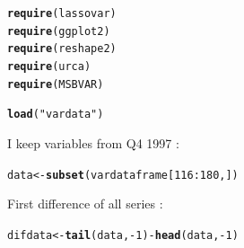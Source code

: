 \documentclass[11pt,oneside, a4paper]{amsart}\usepackage[]{graphicx}\usepackage[]{color}
\makeatletter
\newcommand{\hlnum}[1]{\textcolor[rgb]{0.686,0.059,0.569}{#1}}%
\newcommand{\hlstr}[1]{\textcolor[rgb]{0.192,0.494,0.8}{#1}}%
\newcommand{\hlopt}[1]{\textcolor[rgb]{0,0,0}{#1}}%
\newcommand{\hlstd}[1]{\textcolor[rgb]{0.345,0.345,0.345}{#1}}%
\newcommand{\hlkwb}[1]{\textcolor[rgb]{0.69,0.353,0.396}{#1}}%
\newcommand{\hlkwd}[1]{\textcolor[rgb]{0.737,0.353,0.396}{\textbf{#1}}}%
\newenvironment{kframe}{%
 \def\at@end@of@kframe{}%
 \ifinner\ifhmode%
  \def\at@end@of@kframe{\end{minipage}}%
  \begin{minipage}{\columnwidth}%
 \fi\fi%
 \def\FrameCommand##1{\hskip\@totalleftmargin \hskip-\fboxsep
 \colorbox{shadecolor}{##1}\hskip-\fboxsep
     \hskip-\linewidth \hskip-\@totalleftmargin \hskip\columnwidth}%
 \MakeFramed {\advance\hsize-\width
   \@totalleftmargin\z@ \linewidth\hsize
   \@setminipage}}%
 {\par\unskip\endMakeFramed%
 \at@end@of@kframe}
\newenvironment{knitrout}{}{} %
\makeatother
\begin{document}
\begin{knitrout}
\color{fgcolor}\begin{kframe}
\begin{alltt}
\hlkwd{require}\hlstd{(lassovar)}
\hlkwd{require}\hlstd{(ggplot2)}
\hlkwd{require}\hlstd{(reshape2)}
\hlkwd{require}\hlstd{(urca)}
\hlkwd{require}\hlstd{(MSBVAR)}
\end{alltt}
\end{kframe}
\end{knitrout}

\begin{knitrout}
\color{fgcolor}\begin{kframe}
\begin{alltt}
\hlkwd{load}\hlstd{(}\hlstr{"vardata"}\hlstd{)}
\end{alltt}
\end{kframe}
\end{knitrout}

I keep variables from Q4 1997 :
\begin{knitrout}
\color{fgcolor}\begin{kframe}
\begin{alltt}
\hlstd{data}\hlkwb{<-}\hlkwd{subset}\hlstd{(vardataframe[}\hlnum{116}\hlopt{:}\hlnum{180}\hlstd{,])}
\end{alltt}
\end{kframe}
\end{knitrout}

First difference of all series : 
\begin{knitrout}
\color{fgcolor}\begin{kframe}
\begin{alltt}
\hlstd{difdata} \hlkwb{<-} \hlkwd{tail}\hlstd{(data,}\hlopt{-}\hlnum{1}\hlstd{)} \hlopt{-} \hlkwd{head}\hlstd{(data,}\hlopt{-}\hlnum{1}\hlstd{)}
\end{alltt}
\end{kframe}
\end{knitrout}
\end{document}
